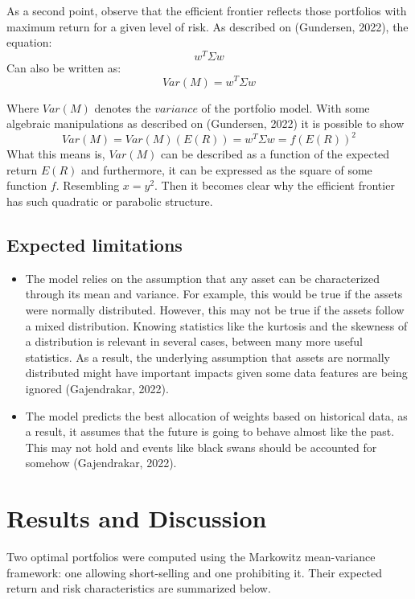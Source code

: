 \documentclass[11pt]{article}
\begin{document}
As a second point, observe that the efficient frontier reflects those portfolios with maximum return for a given level of risk. As described on (Gundersen, 2022), the equation:
\begin{equation}
    w^T \Sigma w
\end{equation}
Can also be written as:
\begin{equation}
    Var(M) = w^T \Sigma w 
\end{equation}

Where $Var(M)$ denotes the $variance$ of the portfolio model. With some algebraic manipulations as described on (Gundersen, 2022) it is possible to show
\begin{equation}
    Var(M) = Var(M) (E(R)) = w^T \Sigma w = f(E(R))^2 
\end{equation}
What this means is, $Var(M)$ can be described as a function of the expected return $E(R)$ and furthermore, it can be expressed as the square of some function $f$. Resembling $x=y^2$. Then it becomes clear why the efficient frontier has such quadratic or parabolic structure.

\subsection*{Expected limitations}
\begin{itemize}
    \item The model relies on the assumption that any asset can be characterized through its mean and variance. For example, this would be true if the assets were normally distributed. However, this may not be true if the assets follow a mixed distribution. Knowing statistics like the kurtosis and the skewness of a distribution is relevant in several cases, between many more useful statistics. As a result, the underlying assumption that assets are normally distributed might have important impacts given some data features are being ignored (Gajendrakar, 2022).
    
    \item The model predicts the best allocation of weights based on historical data, as a result, it assumes that the future is going to behave almost like the past. This may not hold and events like black swans should be accounted for somehow (Gajendrakar, 2022).
    
\end{itemize}




\section{Results and Discussion}
Two optimal portfolios were computed using the Markowitz mean-variance framework: one allowing short-selling and one prohibiting it. Their expected return and risk characteristics are summarized below.
\end{document}
